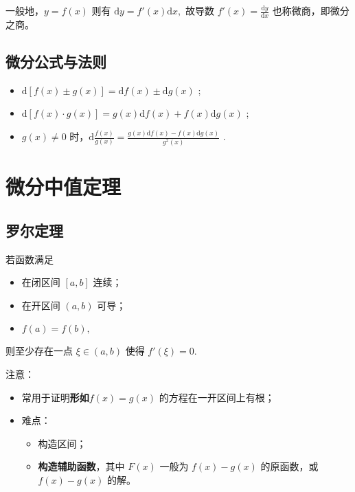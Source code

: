 一般地，$ y=f(x) $ 则有 $ \mathrm{d}y=f'(x)\mathrm{d}x, $ 故导数 $ f'(x)=\frac{\mathrm{d}y}{\mathrm{d}x} $ 也称微商，即微分之商。

\subsection{微分公式与法则}

\begin{itemize}
    \item $ \mathrm{d}[f(x)\pm g(x)]=\mathrm{d}f(x)\pm\mathrm{d}g(x) $ ;
    \item $ \mathrm{d}[f(x)\cdot g(x)]=g(x)\mathrm{d}f(x)+f(x)\mathrm{d}g(x) $ ;
    \item $ g(x)\neq0 $ 时，$ \mathrm{d}\frac{f(x)}{g(x)}=\frac{g(x)\mathrm{d}f(x)-f(x)\mathrm{d}g(x)}{g^2(x)} $ .
\end{itemize}

\section{微分中值定理}

\subsection{罗尔定理}

\begin{Theo}[罗尔定理]

    若函数满足
    \begin{itemize}
        \item 在闭区间 $ [a,b] $ 连续；
        \item 在开区间 $ (a,b) $ 可导；
        \item $ f(a)=f(b), $ 
    \end{itemize}
    则至少存在一点 $ \xi\in(a,b) $ 使得 $ f'(\xi)=0. $ 
\end{Theo}
注意：
\begin{itemize}
    \item 常用于证明\textbf{形如}$ f(x)=g(x) $ 的方程在一开区间上有根；
    \item 难点：\begin{itemize}
        \item 构造区间；
        \item \textbf{构造辅助函数}，其中 $ F(x) $ 一般为 $ f(x)-g(x) $ 的原函数，或 $ f(x)-g(x) $ 的解。
    \end{itemize}
\end{itemize}

